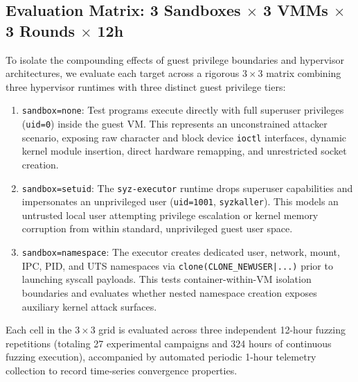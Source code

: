 \documentclass{article}
\begin{document}
\subsection{Evaluation Matrix: 3 Sandboxes $\times$ 3 VMMs $\times$ 3 Rounds $\times$ 12h}\label{sec:eval_matrix}
To isolate the compounding effects of guest privilege boundaries and hypervisor architectures, we evaluate each target across a rigorous $3 \times 3$ matrix combining three hypervisor runtimes with three distinct guest privilege tiers:
\begin{enumerate}[leftmargin=*]
    \item \texttt{sandbox=none}: Test programs execute directly with full superuser privileges (\texttt{uid=0}) inside the guest VM. This represents an unconstrained attacker scenario, exposing raw character and block device \texttt{ioctl} interfaces, dynamic kernel module insertion, direct hardware remapping, and unrestricted socket creation.
    \item \texttt{sandbox=setuid}: The \texttt{syz-executor} runtime drops superuser capabilities and impersonates an unprivileged user (\texttt{uid=1001}, \texttt{syzkaller}). This models an untrusted local user attempting privilege escalation or kernel memory corruption from within standard, unprivileged guest user space.
    \item \texttt{sandbox=namespace}: The executor creates dedicated user, network, mount, IPC, PID, and UTS namespaces via \texttt{clone(CLONE\_NEWUSER|...)} prior to launching syscall payloads. This tests container-within-VM isolation boundaries and evaluates whether nested namespace creation exposes auxiliary kernel attack surfaces.
\end{enumerate}
Each cell in the $3 \times 3$ grid is evaluated across three independent 12-hour fuzzing repetitions (totaling 27 experimental campaigns and 324 hours of continuous fuzzing execution), accompanied by automated periodic 1-hour telemetry collection to record time-series convergence properties.
\end{document}
